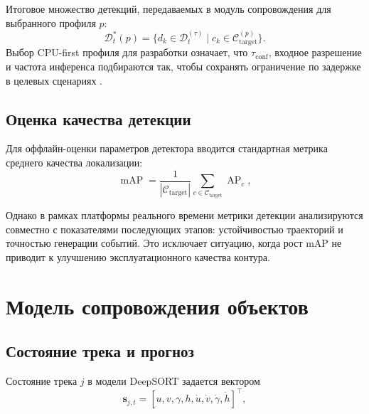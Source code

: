 Итоговое множество детекций, передаваемых в модуль сопровождения для выбранного профиля \(p\):
\begin{equation}
\mathcal{D}^{*}_t(p) =
\{d_k \in \mathcal{D}^{(\tau)}_t \mid c_k \in \mathcal{C}_{\text{target}}^{(p)}\}.
\end{equation}
Выбор CPU-first профиля для разработки означает, что \(\tau_{\text{conf}}\), входное разрешение и частота инференса подбираются так, чтобы сохранять ограничение по задержке в целевых сценариях \cite{ultralytics_docs}.

\subsection{Оценка качества детекции}

Для оффлайн-оценки параметров детектора вводится стандартная метрика среднего качества локализации:
\begin{equation}
\operatorname{mAP} = \frac{1}{|\mathcal{C}_{\text{target}}|}\sum_{c \in \mathcal{C}_{\text{target}}}\operatorname{AP}_c,
\end{equation}
\where
{}

Однако в рамках платформы реального времени метрики детекции анализируются совместно с показателями последующих этапов: устойчивостью траекторий и точностью генерации событий. Это исключает ситуацию, когда рост mAP не приводит к улучшению эксплуатационного качества контура.

\section{Модель сопровождения объектов}

\subsection{Состояние трека и прогноз}

Состояние трека \(j\) в модели DeepSORT задается вектором
\begin{equation}
\mathbf{s}_{j,t} = [u, v, \gamma, h, \dot{u}, \dot{v}, \dot{\gamma}, \dot{h}]^\top,
\end{equation}
\where
{}
 \cite{wojke2017deepsort}

